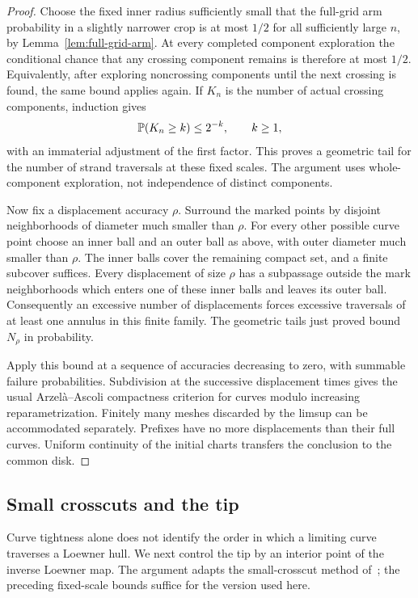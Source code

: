 \begin{proof}
Choose the fixed inner radius sufficiently small that the
full-grid arm probability in a slightly narrower crop is at most
$1/2$ for all sufficiently large $n$, by
Lemma~\ref{lem:full-grid-arm}.  At every completed component
exploration the conditional chance that any crossing component
remains is therefore at most $1/2$.  Equivalently, after exploring
noncrossing components until the next crossing is found, the same
bound applies again.  If $K_n$ is the number of actual crossing
components, induction gives
\[
 \P(K_n\ge k)\le 2^{-k},\qquad k\ge1,
\]
with an immaterial adjustment of the first factor.  This proves a
geometric tail for the number of strand traversals at these fixed
scales.  The argument uses whole-component exploration, not
independence of distinct components.

Now fix a displacement accuracy $\rho$.  Surround the marked points
by disjoint neighborhoods of diameter much smaller than $\rho$.
For every other possible curve point choose an inner ball and an
outer ball as above, with outer diameter much smaller than $\rho$.
The inner balls cover the remaining compact set, and a finite
subcover suffices.  Every displacement of size $\rho$ has a
subpassage outside the mark neighborhoods which enters one of these
inner balls and leaves its outer ball.  Consequently an excessive
number of displacements forces excessive traversals of at least
one annulus in this finite family.  The geometric tails just proved
bound $N_\rho$ in probability.

Apply this bound at a sequence of accuracies decreasing to zero,
with summable failure probabilities.  Subdivision at the successive
displacement times gives the usual Arzel\`a--Ascoli compactness
criterion for curves modulo increasing reparametrization.  Finitely
many meshes discarded by the limsup can be accommodated separately.
Prefixes have no more displacements than their full curves.
Uniform continuity of the initial charts transfers the conclusion
to the common disk.
\end{proof}

\subsection{Small crosscuts and the tip}

Curve tightness alone does not identify the order in which a limiting
curve traverses a Loewner hull.  We next control the tip by an interior
point of the inverse Loewner map.  The argument adapts the
small-crosscut method of~\cite[Section 3.4, Proposition 3.12 and
Theorem 3.11]{KS}; the preceding fixed-scale bounds suffice for the
version used here.

